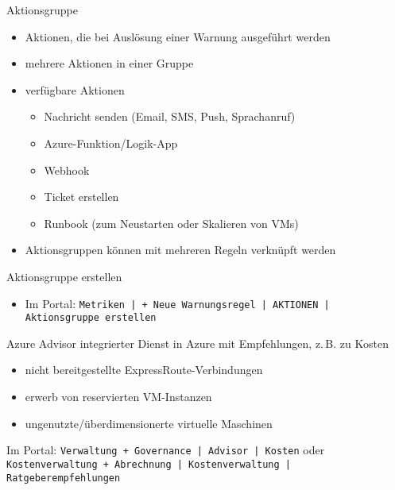 
\begin{flashcard}[Definition]{Aktionsgruppe}
    \begin{itemize}
        \item Aktionen, die bei Auslösung einer Warnung ausgeführt werden
        \item mehrere Aktionen in einer Gruppe
        \item verfügbare Aktionen
            \begin{itemize}
                \item Nachricht senden (Email, SMS, Push, Sprachanruf)
                \item Azure-Funktion/Logik-App
                \item Webhook
                \item Ticket erstellen
                \item Runbook (zum Neustarten oder Skalieren von VMs)
            \end{itemize}
        \item Aktionsgruppen können mit mehreren Regeln verknüpft werden
    \end{itemize}
\end{flashcard}

\begin{flashcard}[Definition]{Aktionsgruppe erstellen}
    \begin{itemize}
        \item Im Portal:\newline
            \texttt{Metriken | + Neue Warnungsregel | AKTIONEN | Aktionsgruppe erstellen}
    \end{itemize}
\end{flashcard}


\begin{flashcard}[Definition]{Azure Advisor}
    integrierter Dienst in Azure mit Empfehlungen, z.\,B. zu Kosten
    \begin{itemize}
        \item nicht bereitgestellte ExpressRoute-Verbindungen
        \item erwerb von reservierten VM-Instanzen
        \item ungenutzte/überdimensionerte virtuelle Maschinen
    \end{itemize}
    Im Portal: \texttt{Verwaltung + Governance | Advisor | Kosten}
    oder \texttt{Kostenverwaltung + Abrechnung | Kostenverwaltung | Ratgeberempfehlungen }
\end{flashcard}

